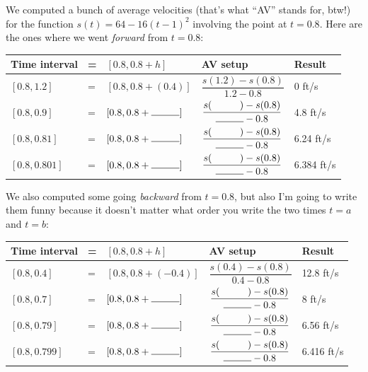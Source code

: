 


%


\allowdisplaybreaks
\def\arraystretch{3}
We computed a bunch of average velocities (that's what ``AV'' stands for, btw!) for the function $s(t) = 64-16(t-1)^2$ involving the point at $t=0.8$. Here are the ones where we went \textit{forward} from $t=0.8$:

{\large
\begin{tabular}{lllll}
    Time interval &=& $[0.8, 0.8+h]$ & AV setup & Result \\\hline
    $[0.8, 1.2]$ &=& $ [0.8, 0.8+(0.4)]$ &
    $\dfrac{s(1.2) - s(0.8)}{1.2 - 0.8}$ &
    0 ft/s \\
    $[0.8, 0.9]$ &=& $ [0.8, 0.8+\rule{1cm}{0.15mm}]$ &
    $\dfrac{s(\hspace{1cm}) - s(0.8)}{\rule{1cm}{0.15mm} - 0.8}$ &
    4.8 ft/s \\
    $[0.8, 0.81]$ &=& $ [0.8, 0.8+\rule{1cm}{0.15mm}]$ &
    $\dfrac{s(\hspace{1cm}) - s(0.8)}{\rule{1cm}{0.15mm} - 0.8}$ &
    6.24 ft/s \\
    $[0.8, 0.801]$ &=& $ [0.8, 0.8+\rule{1cm}{0.15mm}]$ &
    $\dfrac{s(\hspace{1cm}) - s(0.8)}{\rule{1cm}{0.15mm} - 0.8}$ &
    6.384 ft/s \\
\end{tabular}
}

\vspace{2em}

We also computed some going \textit{backward} from $t=0.8$, but also I'm going to write them funny because it doesn't matter what order you write the two times $t=a$ and $t=b$:

{\large
\begin{tabular}{lllll}
    Time interval &=& $[0.8, 0.8+h]$ & AV setup & Result \\\hline
    $[0.8, 0.4]$ &=& $ [0.8, 0.8+(-0.4)]$ &
    $\dfrac{s(0.4) - s(0.8)}{0.4 - 0.8}$ &
    12.8 ft/s \\
    $[0.8, 0.7]$ &=& $ [0.8, 0.8+\rule{1cm}{0.15mm}]$ &
    $\dfrac{s(\hspace{1cm}) - s(0.8)}{\rule{1cm}{0.15mm} - 0.8}$ &
    8 ft/s \\
    $[0.8, 0.79]$ &=& $ [0.8, 0.8+\rule{1cm}{0.15mm}]$ &
    $\dfrac{s(\hspace{1cm}) - s(0.8)}{\rule{1cm}{0.15mm} - 0.8}$ &
    6.56 ft/s \\
    $[0.8, 0.799]$ &=& $ [0.8, 0.8+\rule{1cm}{0.15mm}]$ &
    $\dfrac{s(\hspace{1cm}) - s(0.8)}{\rule{1cm}{0.15mm} - 0.8}$ &
    6.416 ft/s \\
\end{tabular}
}

